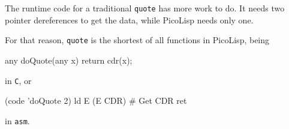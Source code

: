 The runtime code for a traditional \texttt{quote} has more work to do. It needs two
pointer dereferences to get the data, while PicoLisp needs only one.

For that reason, \texttt{quote} is the shortest of all functions in PicoLisp, being
\begin{wideverbatim}
   any doQuote(any x) {return cdr(x);}
\end{wideverbatim}

in \texttt{C}, or
\begin{wideverbatim}
   (code 'doQuote 2)
      ld E (E CDR)  # Get CDR
      ret
\end{wideverbatim}

in \texttt{asm}.


